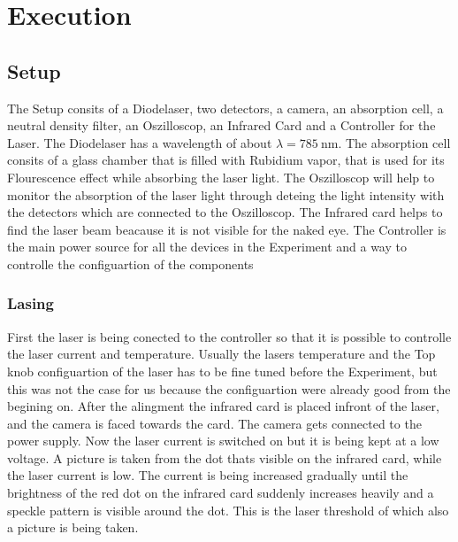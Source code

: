 \section{Execution}
\label{sec:Durchführung}

\subsection{Setup}
The Setup consits of a Diodelaser, two detectors, a camera, an absorption cell, a neutral density filter, an Oszilloscop, an Infrared Card and a Controller for the Laser.
The Diodelaser has a wavelength of about $\lambda = \SI{785}{\nano\meter}$.
The absorption cell consits of a glass chamber that is filled with Rubidium vapor, that is used for its Flourescence effect while absorbing the laser light.
The Oszilloscop will help to monitor the absorption of the laser light through deteing the light intensity with the detectors which are connected to the Oszilloscop.
The Infrared card helps to find the laser beam beacause it is not visible for the naked eye.
The Controller is the main power source for all the devices in the Experiment and a way to controlle the configuartion of the components

\subsubsection{Lasing}
First the laser is being conected to the controller so that it is possible to controlle the laser current and temperature.
Usually the lasers temperature and the Top knob configuartion of the laser has to be fine tuned before the Experiment, but this was not the case for us because the configuartion were already good from the begining on.
After the alingment the infrared card is placed infront of the laser, and the camera is faced towards the card.
The camera gets connected to the power supply.
Now the laser current is switched on but it is being kept at a low voltage.
A picture is taken from the dot thats visible on the infrared card, while the laser current is low.
The current is being increased gradually until the brightness of the red dot on the infrared card suddenly increases heavily and a speckle pattern is visible around the dot.
This is the laser threshold of which also a picture is being taken.

